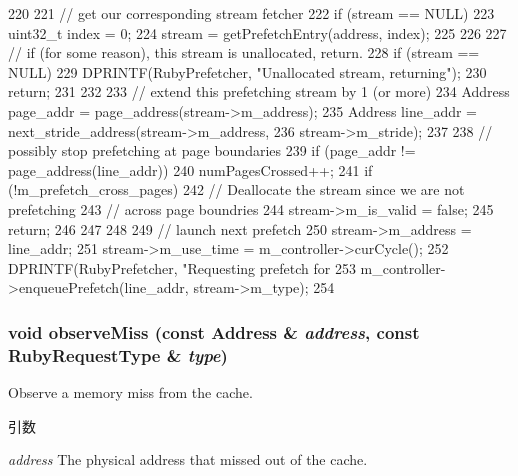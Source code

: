 \begin{DoxyCode}
220 {
221     // get our corresponding stream fetcher
222     if (stream == NULL) {
223         uint32_t index = 0;
224         stream = getPrefetchEntry(address, index);
225     }
226 
227     // if (for some reason), this stream is unallocated, return.
228     if (stream == NULL) {
229         DPRINTF(RubyPrefetcher, "Unallocated stream, returning\n");
230         return;
231     }
232 
233     // extend this prefetching stream by 1 (or more)
234     Address page_addr = page_address(stream->m_address);
235     Address line_addr = next_stride_address(stream->m_address,
236                                             stream->m_stride);
237 
238     // possibly stop prefetching at page boundaries
239     if (page_addr != page_address(line_addr)) {
240         numPagesCrossed++;
241         if (!m_prefetch_cross_pages) {
242             // Deallocate the stream since we are not prefetching
243             // across page boundries
244             stream->m_is_valid = false;
245             return;
246         }
247     }
248 
249     // launch next prefetch
250     stream->m_address = line_addr;
251     stream->m_use_time = m_controller->curCycle();
252     DPRINTF(RubyPrefetcher, "Requesting prefetch for %
253     m_controller->enqueuePrefetch(line_addr, stream->m_type);
254 }
\end{DoxyCode}
\hypertarget{classPrefetcher_a0aeb99b55e0ebe2fe1ebc894a1f08ebc}{
\subsubsection[{observeMiss}]{\setlength{\rightskip}{0pt plus 5cm}void observeMiss (const {\bf Address} \& {\em address}, \/  const RubyRequestType \& {\em type})}}
\label{classPrefetcher_a0aeb99b55e0ebe2fe1ebc894a1f08ebc}
Observe a memory miss from the cache.


\begin{DoxyParams}{引数}
\item[{\em address}]The physical address that missed out of the cache. \end{DoxyParams}



